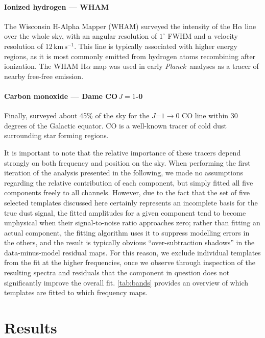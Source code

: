 \documentclass{aa}
\def\Planck{\textit{Planck}}
\begin{document}
\paragraph{Ionized hydrogen --- WHAM}
The Wisconsin H-Alpha Mapper (WHAM) \citep{wham_north:2003,
  wham_south:2010} surveyed the intensity of the H$\alpha$ line over
the whole sky, with an angular resolution of $1^{\circ}$ FWHM and a velocity
resolution of 12\,$\mathrm{km\,s^{-1}}$. This line is typically associated with higher
energy regions, as it is most commonly emitted from hydrogen atoms
recombining after ionization. The WHAM H$\alpha$ map was used in early
\Planck\ analyses as a tracer of nearby free-free emission.

\paragraph{Carbon monoxide --- Dame CO\,$J=1$-0}
Finally, \citet{dame:2001} surveyed about 45\% of the sky for the
$J$=$1\rightarrow0$ CO line within 30 degrees of the Galactic
equator. CO is a well-known tracer of cold dust surrounding star
forming regions.

It is important to note that the relative importance of these tracers
depend strongly on both frequency and position on the sky. When
performing the first iteration of the analysis presented in the
following, we made no assumptions regarding the relative contribution
of each component, but simply fitted all five components freely to all
channels. However, due to the fact that the set of five selected
templates discussed here certainly represents an incomplete basis for
the true dust signal, the fitted amplitudes for a given component tend
to become unphysical when their signal-to-noise ratio approaches zero;
rather than fitting an actual component, the fitting algorithm uses it
to suppress modelling errors in the others, and the result is
typically obvious ``over-subtraction shadows'' in the data-minus-model
residual maps. For this reason, we exclude individual templates from
the fit at the higher frequencies, once we observe through inspection
of the resulting spectra and residuals that the component in question
does not significantly improve the overall fit. \cref{tab:bands}
provides an overview of which templates are fitted to which frequency
maps.

\section{Results}
\label{sec:results}
\end{document}
